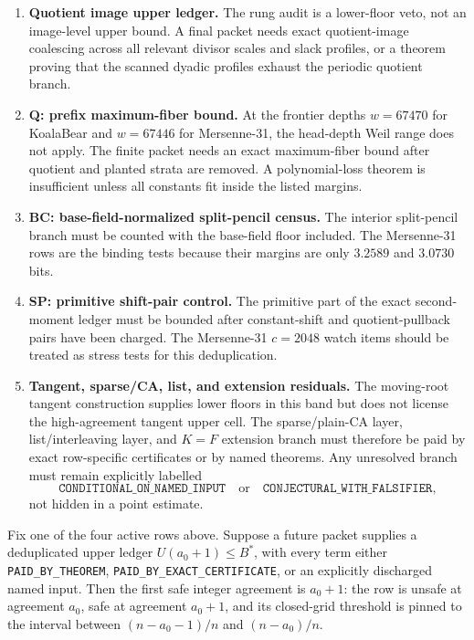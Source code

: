 \begin{enumerate}[label=\textup{(\arabic*)},leftmargin=2.4em]
\item \textbf{Quotient image upper ledger.}
The rung audit is a lower-floor veto, not an image-level upper bound.  A final
packet needs exact quotient-image coalescing across all relevant divisor
scales and slack profiles, or a theorem proving that the scanned dyadic
profiles exhaust the periodic quotient branch.

\item \textbf{Q: prefix maximum-fiber bound.}
At the frontier depths \(w=67470\) for KoalaBear and \(w=67446\) for
Mersenne-31, the head-depth Weil range does not apply.  The finite packet needs
an exact maximum-fiber bound after quotient and planted strata are removed.
A polynomial-loss theorem is insufficient unless all constants fit inside the
listed margins.

\item \textbf{BC: base-field-normalized split-pencil census.}
The interior split-pencil branch must be counted with the base-field floor
included.  The Mersenne-31 rows are the binding tests because their margins
are only \(3.2589\) and \(3.0730\) bits.

\item \textbf{SP: primitive shift-pair control.}
The primitive part of the exact second-moment ledger must be bounded after
constant-shift and quotient-pullback pairs have been charged.  The
Mersenne-31 \(c=2048\) watch items should be treated as stress tests for this
deduplication.

\item \textbf{Tangent, sparse/CA, list, and extension residuals.}
The moving-root tangent construction supplies lower floors in this band but
does not license the high-agreement tangent upper cell.  The sparse/plain-CA
layer, list/interleaving layer, and \(K=F\) extension branch must therefore be
paid by exact row-specific certificates or by named theorems.  Any unresolved
branch must remain explicitly labelled
\[
\texttt{CONDITIONAL\_ON\_NAMED\_INPUT}
\quad\text{or}\quad
\texttt{CONJECTURAL\_WITH\_FALSIFIER},
\]
not hidden in a point estimate.
\end{enumerate}

\begin{theorem}
\label{thm:finite-next-compiler}
Fix one of the four active rows above.  Suppose a future packet supplies a
deduplicated upper ledger \(U(a_0+1)\le B^*\), with every term either
\texttt{PAID\_BY\_THEOREM}, \texttt{PAID\_BY\_EXACT\_CERTIFICATE}, or an
explicitly discharged named input.  Then the first safe integer agreement is
\(a_0+1\): the row is unsafe at agreement \(a_0\), safe at agreement
\(a_0+1\), and its closed-grid threshold is pinned to the interval between
\((n-a_0-1)/n\) and \((n-a_0)/n\).
\end{theorem}

